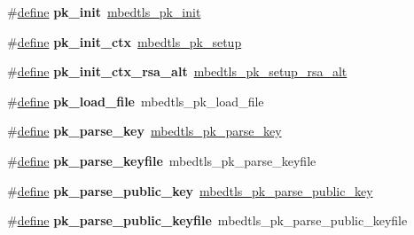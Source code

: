 \begin{DoxyCompactItemize}
\mbox{\label{compat-1_83_8h_ae60c8908b3cf09416f8b2449e10999e1}} 
\#\hyperlink{structdefine}{define} {\bfseries pk\+\_\+init}~\hyperlink{pk_8h_a999d1160bb30c03d0c4382c3a9b0aa89}{mbedtls\+\_\+pk\+\_\+init}
\item 
\mbox{\label{compat-1_83_8h_af85f763fa88c3d85a6d9eba78ebbceb3}} 
\#\hyperlink{structdefine}{define} {\bfseries pk\+\_\+init\+\_\+ctx}~\hyperlink{pk_8h_a7d6cc2c1768cc6db883b08c3c0f10889}{mbedtls\+\_\+pk\+\_\+setup}
\item 
\mbox{\label{compat-1_83_8h_a3f2273b7023738d0fa10b169f5375c31}} 
\#\hyperlink{structdefine}{define} {\bfseries pk\+\_\+init\+\_\+ctx\+\_\+rsa\+\_\+alt}~\hyperlink{pk_8h_ab719d0b89ef0a49fef2bc8ba20e4726b}{mbedtls\+\_\+pk\+\_\+setup\+\_\+rsa\+\_\+alt}
\item 
\mbox{\label{compat-1_83_8h_a8367904e04aebdb9186a76d48e512301}} 
\#\hyperlink{structdefine}{define} {\bfseries pk\+\_\+load\+\_\+file}~mbedtls\+\_\+pk\+\_\+load\+\_\+file
\item 
\mbox{\label{compat-1_83_8h_a9c3996433e9c651455157b2d2f0fbefd}} 
\#\hyperlink{structdefine}{define} {\bfseries pk\+\_\+parse\+\_\+key}~\hyperlink{pk_8h_a072d27dc4143bfd600786232f9417e08}{mbedtls\+\_\+pk\+\_\+parse\+\_\+key}
\item 
\mbox{\label{compat-1_83_8h_aeb7a8944562a48e16dc8b692771759ad}} 
\#\hyperlink{structdefine}{define} {\bfseries pk\+\_\+parse\+\_\+keyfile}~mbedtls\+\_\+pk\+\_\+parse\+\_\+keyfile
\item 
\mbox{\label{compat-1_83_8h_ad3f775ca05ea037e9ceba5f8d0334835}} 
\#\hyperlink{structdefine}{define} {\bfseries pk\+\_\+parse\+\_\+public\+\_\+key}~\hyperlink{pk_8h_ade680bf8e87df7ccc3bb36b52e43972b}{mbedtls\+\_\+pk\+\_\+parse\+\_\+public\+\_\+key}
\item 
\mbox{\label{compat-1_83_8h_a2b5665045753c4912a79b4a31b23009d}} 
\#\hyperlink{structdefine}{define} {\bfseries pk\+\_\+parse\+\_\+public\+\_\+keyfile}~mbedtls\+\_\+pk\+\_\+parse\+\_\+public\+\_\+keyfile
\item 
\mbox{\label{compat-1_83_8h_aa221401c4624d4a39ce04add8c3b1814}} 

\end{DoxyCompactItemize}
